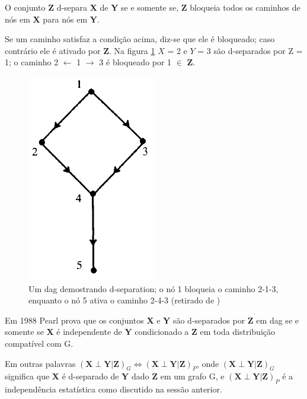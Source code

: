 O conjunto \textbf{Z} d-separa \textbf{X} de \textbf{Y} se e somente se, \textbf{Z} bloqueia todos os caminhos de nós em \textbf{X} para nós em \textbf{Y}.

Se um caminho satisfaz a condição acima, diz-se que ele é bloqueado; caso contrário ele é ativado por \textbf{Z}. Na figura \ref{fig:d-sep} $X$ = {2} e $Y$ = {3} são d-separados por Z = {1}; o caminho 2 $\leftarrow$ 1 $\rightarrow$ 3 é bloqueado por 1 $\in$ \textbf{Z}.
\begin{figure}[H]
	\centering
	\includegraphics{figuras/d-separation}
	\caption[Exemplo D-separation]{Um \gls{dag} demostrando d-separation; o nó 1 bloqueia o caminho 2-1-3, enquanto o nó 5 ativa o caminho 2-4-3 (retirado de \cite{pearl88})}
	\label{fig:d-sep}
\end{figure}

Em 1988 Pearl prova que os conjuntos \textbf{X} e \textbf{Y} são d-separados por \textbf{Z} em \gls{dag} se e somente se \textbf{X} é independente de \textbf{Y} condicionado a \textbf{Z} em toda distribuição compatível com G.

Em outras palavras $(\textbf{X} \perp \textbf{Y}|\textbf{Z})_G \Leftrightarrow (\textbf{X}\perp\textbf{Y}|\textbf{Z})_P$, onde $(\textbf{X}\perp\textbf{Y}|\textbf{Z})_G$ significa que \textbf{X} é d-separado de \textbf{Y} dado \textbf{Z} em um grafo G, e $(\textbf{X}\perp \textbf{Y}|\textbf{Z})_P$ é a independência estatística como discutido na sessão anterior.

